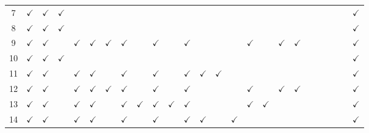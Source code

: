 \documentclass{article}
\newcommand\covered{\ensuremath{\checkmark}}
\begin{document}
\begin{table}[htbp]
\begin{minipage}[t]{\linewidth}
{\begin{tabular}{c *{24}{c}}
      7       & \covered & \covered & \covered &          &          &          &          &          &          &          &          &          &          &          &          &          &          &          &          &          &          &           &          & \covered     \\
      8       & \covered & \covered & \covered &          &          &          &          &          &          &          &          &          &          &          &          &          &          &          &          &          &          &           &          & \covered     \\
      9       & \covered & \covered &          & \covered & \covered & \covered & \covered &          & \covered &          & \covered &          &          &          & \covered &          & \covered & \covered &          &          &          &           &          & \covered     \\
      10      & \covered & \covered & \covered &          &          &          &          &          &          &          &          &          &          &          &          &          &          &          &          &          &          &           &          & \covered     \\
      11      & \covered & \covered &          & \covered & \covered &          & \covered &          & \covered &          & \covered & \covered & \covered &          &          &          &          &          &          &          &          &           &          & \covered     \\
      12      & \covered & \covered &          & \covered & \covered & \covered & \covered &          & \covered &          & \covered &          &          &          & \covered &          & \covered & \covered &          &          &          &           &          & \covered     \\
      13      & \covered & \covered &          & \covered & \covered &          & \covered & \covered & \covered & \covered & \covered &          &          &          & \covered & \covered &          &          &          &          &          &           &          & \covered     \\
      14      & \covered & \covered &          & \covered & \covered &          & \covered &          & \covered &          & \covered & \covered &          & \covered &          &          &          &          &          &          &          &           &          & \covered     \\

\end{tabular}}
\end{minipage}
\end{table}
\end{document}

